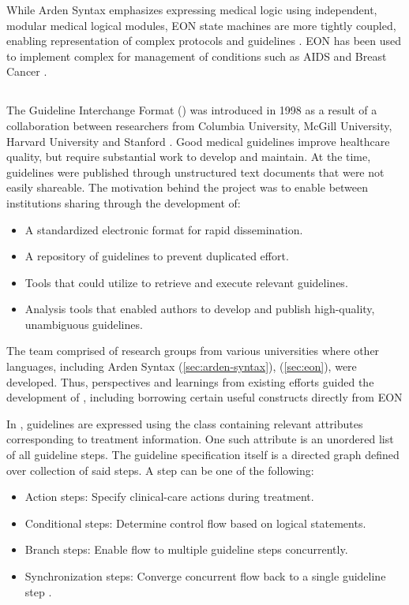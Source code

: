 While Arden Syntax emphasizes expressing medical logic using independent, modular
medical logical modules, EON state machines are more tightly coupled, enabling
representation of complex protocols and guidelines \cite{TuAMIA96}. EON has
been used to implement complex \CDSSs{} for management of conditions such as
AIDS \cite{MusenJAMIA96} and Breast Cancer \cite{TuAMIA96}.

\subsection{\GLIF{}}\label{sec:glif}

The Guideline Interchange Format (\GLIF{}) was introduced in 1998 as a
result of a collaboration between researchers from Columbia University,
McGill University, Harvard University and Stanford \cite{ClerqAIM03}. Good medical
guidelines improve healthcare quality, but require substantial work
to develop and maintain. At the time, guidelines were published through
unstructured text documents that were not easily shareable. The motivation
behind the \GLIF{} project was to enable \BPG{} between institutions sharing
through the development of:
\begin{itemize}
  \item A standardized electronic format for rapid dissemination.
  \item A repository of guidelines to prevent duplicated effort.
  \item Tools that \HCPs{} could utilize to retrieve and
    execute relevant guidelines.
  \item Analysis tools that enabled authors to develop
    and publish high-quality, unambiguous guidelines.
\end{itemize}

The \GLIF{} team comprised of research groups from various universities
where other languages, including Arden Syntax (\autoref{sec:arden-syntax}),
\GEODECM{} (\autoref{sec:eon}),
were developed. Thus, perspectives and learnings from existing efforts guided
the development of \GLIF{}, including borrowing certain useful constructs
directly from EON \cite{MachadoJAMIA98}

In \GLIF{}, guidelines are expressed using the \GLIF{} class containing
relevant attributes corresponding to treatment information. One such
attribute is an unordered list of all guideline steps. The guideline
specification itself is a directed graph defined over collection of
said steps. A step can be one of the following:
\begin{itemize}
    \item Action steps: Specify clinical-care actions during treatment.
    \item Conditional steps: Determine control flow based on logical statements.
    \item Branch steps: Enable flow to multiple guideline steps concurrently.
    \item Synchronization steps: Converge concurrent flow back to a single
      guideline step \cite{MachadoJAMIA98}.
\end{itemize}

